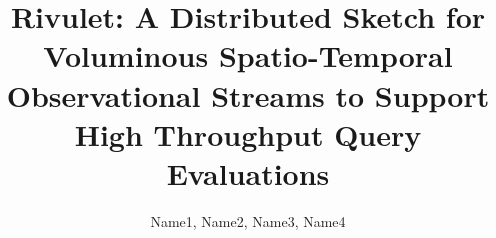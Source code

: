 \documentclass{vldb}
\begin{document}
\title{Rivulet: A Distributed Sketch for Voluminous Spatio-Temporal Observational Streams to Support High Throughput Query Evaluations}

\author{
\alignauthor
Name1, Name2, Name3, Name4\\
       \\
       \\
       \\
}


\maketitle













\end{document}
